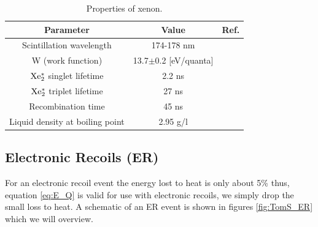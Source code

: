 \renewcommand{\baselinestretch}{1}
\small\normalsize
\begin{table}[h!]
\begin{center}
\begin{tabular}{|c|c|c|}
\hline
Parameter & Value & Ref.\\ \hline
Scintillation wavelength		& 174-178 nm 		&  \cite{Doke_Scintillation} \\ \hline
W (work function)				& 13.7$\pm$0.2 [eV/quanta]	&  \cite{Dahl_Thesis} \\ \hline
$\rm Xe^*_2$	singlet lifetime	& 2.2 ns			& \cite{Xe_singlet_tripplet_lifetime}\\ \hline
$\rm Xe^*_2 $ triplet lifetime 	& 27 ns			&  \cite{Xe_singlet_tripplet_lifetime} \\ \hline
Recombination time 			& 45 ns			 & \cite{Xe_Recombination_Time}\\ \hline
Liquid density at boiling point	& 2.95 g/l 			& \cite{Xe_Density} \\ \hline
\end{tabular}
\caption{Properties of xenon.}
\label{table:Xe_Properties}
\end{center}
\end{table}
\renewcommand{\baselinestretch}{2}
\small\normalsize


\subsection{Electronic Recoils (ER)}
For an electronic recoil event the energy lost to heat is only about 5\% \cite{FanoTheoretical} thus, equation \ref{eq:E_Q} is valid for use with electronic recoils, we simply drop the small loss to heat. A schematic of an ER event is shown in figures \ref{fig:TomS_ER} which we will overview.

